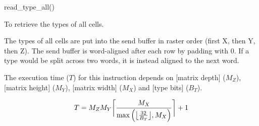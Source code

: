 

\format
read\_type\_all()

\purpose

To retrieve the types of all cells.

\description

The types of all cells are put into the send buffer in raster order (first X, then Y, then Z).
The send buffer is word-aligned after each row by padding with 0.
If a type would be split across two words, it is instead aligned to the next word.

\notes

The execution time ($T$) for this instruction depends on [matrix depth] ($M_Z$), [matrix height] ($M_Y$), [matrix width] ($M_X$) and [type bits] ($B_T$).

$$ T = M_Z M_Y \ceil[\bigg]{ \frac{M_X}{\max \left( \floor[\big]{ \frac{32}{B_T} }, M_X \right)} } + 1 $$
